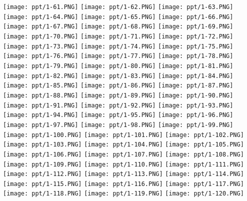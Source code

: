 \documentclass[UTF-8]{ctexart}
\begin{document}
\begin{center}
\texttt{[image: ppt/1-61.PNG]}
\texttt{[image: ppt/1-62.PNG]}
\texttt{[image: ppt/1-63.PNG]}
\texttt{[image: ppt/1-64.PNG]}
\texttt{[image: ppt/1-65.PNG]}
\texttt{[image: ppt/1-66.PNG]}
\texttt{[image: ppt/1-67.PNG]}
\texttt{[image: ppt/1-68.PNG]}
\texttt{[image: ppt/1-69.PNG]}
\texttt{[image: ppt/1-70.PNG]}
\texttt{[image: ppt/1-71.PNG]}
\texttt{[image: ppt/1-72.PNG]}
\texttt{[image: ppt/1-73.PNG]}
\texttt{[image: ppt/1-74.PNG]}
\texttt{[image: ppt/1-75.PNG]}
\texttt{[image: ppt/1-76.PNG]}
\texttt{[image: ppt/1-77.PNG]}
\texttt{[image: ppt/1-78.PNG]}
\texttt{[image: ppt/1-79.PNG]}
\texttt{[image: ppt/1-80.PNG]}
\texttt{[image: ppt/1-81.PNG]}
\texttt{[image: ppt/1-82.PNG]}
\texttt{[image: ppt/1-83.PNG]}
\texttt{[image: ppt/1-84.PNG]}
\texttt{[image: ppt/1-85.PNG]}
\texttt{[image: ppt/1-86.PNG]}
\texttt{[image: ppt/1-87.PNG]}
\texttt{[image: ppt/1-88.PNG]}
\texttt{[image: ppt/1-89.PNG]}
\texttt{[image: ppt/1-90.PNG]}
\texttt{[image: ppt/1-91.PNG]}
\texttt{[image: ppt/1-92.PNG]}
\texttt{[image: ppt/1-93.PNG]}
\texttt{[image: ppt/1-94.PNG]}
\texttt{[image: ppt/1-95.PNG]}
\texttt{[image: ppt/1-96.PNG]}
\texttt{[image: ppt/1-97.PNG]}
\texttt{[image: ppt/1-98.PNG]}
\texttt{[image: ppt/1-99.PNG]}
\texttt{[image: ppt/1-100.PNG]}
\texttt{[image: ppt/1-101.PNG]}
\texttt{[image: ppt/1-102.PNG]}
\texttt{[image: ppt/1-103.PNG]}
\texttt{[image: ppt/1-104.PNG]}
\texttt{[image: ppt/1-105.PNG]}
\texttt{[image: ppt/1-106.PNG]}
\texttt{[image: ppt/1-107.PNG]}
\texttt{[image: ppt/1-108.PNG]}
\texttt{[image: ppt/1-109.PNG]}
\texttt{[image: ppt/1-110.PNG]}
\texttt{[image: ppt/1-111.PNG]}
\texttt{[image: ppt/1-112.PNG]}
\texttt{[image: ppt/1-113.PNG]}
\texttt{[image: ppt/1-114.PNG]}
\texttt{[image: ppt/1-115.PNG]}
\texttt{[image: ppt/1-116.PNG]}
\texttt{[image: ppt/1-117.PNG]}
\texttt{[image: ppt/1-118.PNG]}
\texttt{[image: ppt/1-119.PNG]}
\texttt{[image: ppt/1-120.PNG]}

\end{center}
\end{document}
